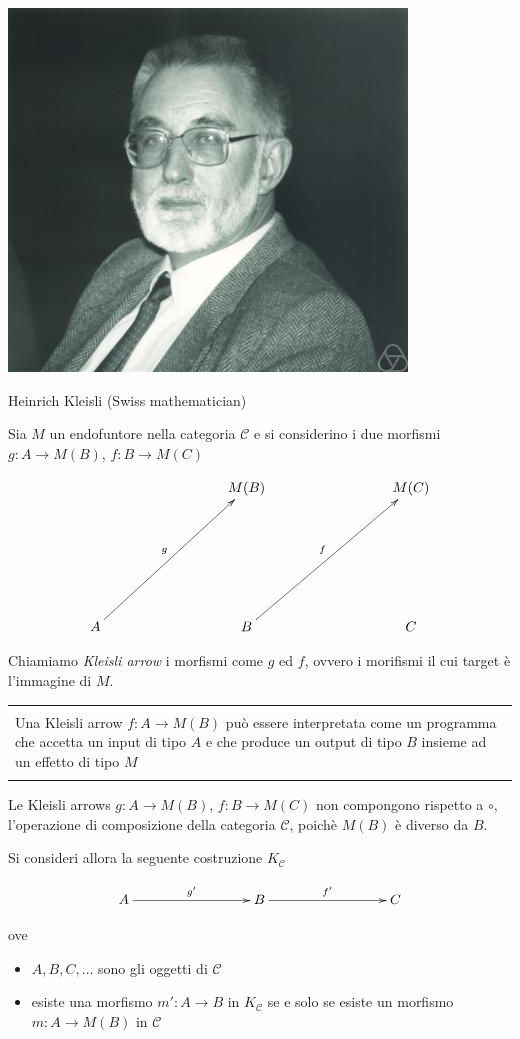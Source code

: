 \documentclass[12pt]{article}
\newenvironment{demo}
    {\begin{center}
    \begin{tabular}{|p{0.9\textwidth}|}
    \hline\\
    }
    {
    \\\\\hline
    \end{tabular}
    \end{center}
    }
\begin{document}
\begin{center}
\includegraphics[scale=0.5]{kleisli}

Heinrich Kleisli (Swiss mathematician)
\end{center}

Sia $M$ un endofuntore nella categoria $\mathcal{C}$ e si considerino i due morfismi $g: A \rightarrow M(B)$, $f: B \rightarrow M(C)$

\[
\xymatrixrowsep{3cm}
\xymatrixcolsep{3cm}
\xymatrix{
  & M(B) & M(C) \\
  A \ar[ur]^g & B \ar[ur]^f & C
}
\]

Chiamiamo \emph{Kleisli arrow} i morfismi come $g$ ed $f$, ovvero i morifismi il cui target è l'immagine di $M$.

\begin{demo}
Una Kleisli arrow $f: A \rightarrow M(B)$ può essere interpretata come un programma che accetta un input di tipo $A$ e che produce un output di tipo $B$ insieme ad un effetto di tipo $M$
\end{demo}

Le Kleisli arrows $g: A \rightarrow M(B)$, $f: B \rightarrow M(C)$ non compongono rispetto a $\circ$, l'operazione di composizione della categoria $\mathcal{C}$,
poichè $M(B)$ è diverso da $B$.

Si consideri allora la seguente costruzione $K_{\mathcal{C}}$

\[
\xymatrixrowsep{3cm}
\xymatrixcolsep{3cm}
\xymatrix{
  A \ar[r]^{g'} & B \ar[r]^{f'} & C
}
\]

ove

\begin{itemize}
  \item $A, B, C, \ldots$ sono gli oggetti di $\mathcal{C}$
  \item esiste una morfismo $m': A \rightarrow B$ in $K_{\mathcal{C}}$ se e solo se esiste un morfismo $m: A \rightarrow M(B)$ in $\mathcal{C}$
\end{itemize}
\end{document}
